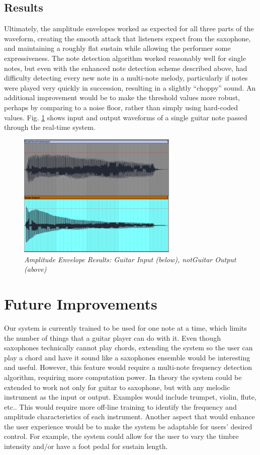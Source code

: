 \documentclass[twoside,a4paper]{article}
\begin{document}
\subsection {Results}
Ultimately, the amplitude envelopes worked as expected for all three parts
of the waveform,  creating the smooth attack that listeners expect from the
saxophone, and maintaining a roughly flat sustain while allowing the performer
some expressiveness. The note detection algorithm
worked reasonably well for single notes, but even with the enhanced note detection
scheme described above, had difficulty detecting every new note in a multi-note melody,
particularly if notes were played very quickly in succession, resulting in a slightly
``choppy'' sound. An additional improvement would be to make the threshold values more robust,
perhaps by comparing to a noise floor, rather than simply using hard-coded values.
Fig. \ref{Result} shows input and output waveforms of a single guitar note passed through
the real-time system.

\begin{figure}[ht]
  \includegraphics[width=3in]{Pictures/Final_pic.PNG}
  \centering
  \caption{\label{Result} {\it Amplitude Envelope Results: Guitar Input (below), notGuitar Output (above)}}
  \centering
  \end{figure}

\section{Future Improvements}
Our system is currently trained to be used for one note at a time,
which limits the number of things that a guitar player can do with
it. Even though saxophones technically cannot play chords, extending
the system so the user can play a chord and have it sound like a
saxophones ensemble would be interesting and useful.
However, this feature would require a multi-note frequency detection
algorithm, requiring more computation power.
\newline\newline
In theory the system could be extended to work not only for guitar
to saxophone, but with any melodic instrument as the input or output.
Examples would include trumpet, violin, flute, etc.. This would
require more off-line training to identify the frequency and
amplitude characteristics of each instrument. Another aspect that would enhance the user experience
would be to make the system be adaptable for users' desired control.
For example, the system could allow for the user to vary the timbre intensity
and/or have a foot pedal for sustain length.
\end{document}
